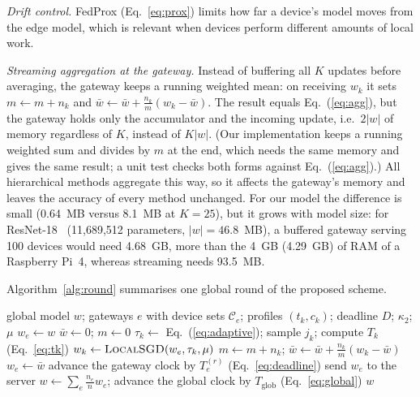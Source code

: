 \documentclass[conference]{IEEEtran}
\newcommand{\wsize}{|w|}
\begin{document}
\textit{Drift control.} FedProx (Eq.~\ref{eq:prox}) limits how far a device's model moves from the edge model, which is relevant when devices perform different amounts of local work.

\textit{Streaming aggregation at the gateway.} Instead of buffering all $K$ updates before averaging, the gateway keeps a running weighted mean: on receiving $w_k$ it sets $m \leftarrow m + n_k$ and $\bar{w} \leftarrow \bar{w} + \frac{n_k}{m}(w_k - \bar{w})$. The result equals Eq.~(\ref{eq:agg}), but the gateway holds only the accumulator and the incoming update, i.e.\ $2\wsize$ of memory regardless of $K$, instead of $K\wsize$. (Our implementation keeps a running weighted sum and divides by $m$ at the end, which needs the same memory and gives the same result; a unit test checks both forms against Eq.~(\ref{eq:agg}).) All hierarchical methods aggregate this way, so it affects the gateway's memory and leaves the accuracy of every method unchanged. For our model the difference is small (0.64~MB versus 8.1~MB at $K = 25$), but it grows with model size: for ResNet-18~\cite{he2016resnet} (11{,}689{,}512 parameters, $\wsize = 46.8$~MB), a buffered gateway serving 100 devices would need 4.68~GB, more than the 4~GB (4.29~GB) of RAM of a Raspberry Pi~4, whereas streaming needs 93.5~MB.

Algorithm~\ref{alg:round} summarises one global round of the proposed scheme.

\begin{algorithm}[t]
\caption{One global round of the proposed scheme}
\label{alg:round}
\small
\begin{algorithmic}[1]
\Require global model $w$; gateways $e$ with device sets $\mathcal{C}_e$; profiles $(t_k, c_k)$; deadline $D$; $\kappa_2$; $\mu$
  \State $w_e \gets w$
    \State $\bar{w} \gets 0$; $m \gets 0$
      \State $\tau_k \gets$ Eq.~(\ref{eq:adaptive}); sample $j_k$; compute $T_k$ (Eq.~\ref{eq:tk})
        \State $w_k \gets \textsc{LocalSGD}(w_e, \tau_k, \mu)$ 
        \State $m \gets m + n_k$; $\bar{w} \gets \bar{w} + \frac{n_k}{m}(w_k - \bar{w})$
      \EndIf
    \EndFor
      \State $w_e \gets \bar{w}$
    \EndIf
    \State advance the gateway clock by $T_e^{(r)}$ (Eq.~\ref{eq:deadline})
  \EndFor
  \State send $w_e$ to the server
\EndFor
\State $w \gets \sum_e \frac{n_e}{n} w_e$; advance the global clock by $T_{\mathrm{glob}}$ (Eq.~\ref{eq:global})
\State \Return $w$
\end{algorithmic}
\end{algorithm}
\end{document}

